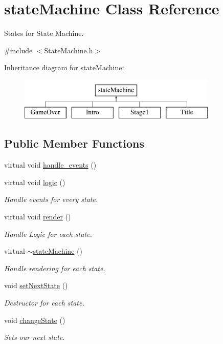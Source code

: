 \hypertarget{classstate_machine}{\section{state\-Machine Class Reference}
\label{classstate_machine}
}


States for State Machine.  




{\ttfamily \#include $<$State\-Machine.\-h$>$}

Inheritance diagram for state\-Machine\-:\begin{figure}[H]
\begin{center}
\leavevmode
\includegraphics[height=2.000000cm]{classstate_machine}
\end{center}
\end{figure}
\subsection*{Public Member Functions}
\begin{DoxyCompactItemize}
\item 
virtual void \hyperlink{classstate_machine_a3fb12b413428098b6e98c0c1525db375}{handle\-\_\-events} ()
\item 
virtual void \hyperlink{classstate_machine_a3823bf8d9d05334eccc5d1d62a099714}{logic} ()
\begin{DoxyCompactList}\small\item\em Handle events for every state. \end{DoxyCompactList}\item 
virtual void \hyperlink{classstate_machine_adf943abf2ca060aa80746f2cdec4daf0}{render} ()
\begin{DoxyCompactList}\small\item\em Handle Logic for each state. \end{DoxyCompactList}\item 
virtual \hyperlink{classstate_machine_afca4850a1876eed86643aed4cc529dc7}{$\sim$state\-Machine} ()
\begin{DoxyCompactList}\small\item\em Handle rendering for each state. \end{DoxyCompactList}\item 
void \hyperlink{classstate_machine_aa37b1c8ff364025c2a1f82d92f9a1ce0}{set\-Next\-State} ()
\begin{DoxyCompactList}\small\item\em Destructor for each state. \end{DoxyCompactList}\item 
void \hyperlink{classstate_machine_a81432eab64611f3d7ac5338aee324257}{change\-State} ()
\begin{DoxyCompactList}\small\item\em Sets our next state. \end{DoxyCompactList}\end{DoxyCompactItemize}


